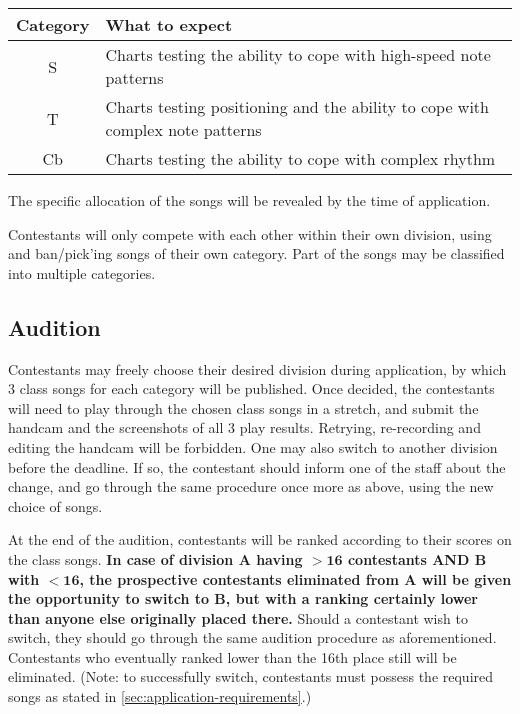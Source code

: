 \documentclass{article}
\newcommand{\alert}[1]{{\color{red} #1}}
\begin{document}
\begin{table}[!htbp]
	\centering
	\begin{tabular}{cl}
		\hline
		Category & What to expect                                                                \\ \hline
		S        & Charts testing the ability to cope with high-speed note patterns              \\
		T        & Charts testing positioning and the ability to cope with complex note patterns \\
		Cb       & Charts testing the ability to cope with complex rhythm                        \\ \hline
	\end{tabular}
\end{table}

\alert{
	The specific allocation of the songs  %
	will be revealed by the time of application.
}

Contestants will only compete with each other
within their own division,
using and ban/pick'ing songs of their own category.
Part of the songs may be classified into multiple categories.

\subsection{Audition}

Contestants may freely choose their desired division
during application,
by which 3 class songs for each category will be published.
Once decided, the contestants will need to play through the chosen class songs in a stretch,
and submit the handcam and the screenshots of all 3 play results.
Retrying, re-recording and editing the handcam will be forbidden.  %
One may also switch to another division before the deadline.
If so, the contestant should inform one of the staff about the change,
and go through the same procedure once more as above,
using the new choice of songs.  %

At the end of the audition,
contestants will be ranked
according to their scores on the class songs.
\textbf{In case of division A having $\mathbf{> 16}$ contestants
	AND B with $\mathbf{< 16}$,
	the prospective contestants eliminated from A
	will be given the opportunity to switch to B,
	but with a ranking certainly lower than
	anyone else originally placed there.}
Should a contestant wish to switch,
they should go through the same
audition procedure as aforementioned.
Contestants who eventually ranked lower than the 16th place
still will be eliminated.
(Note: to successfully switch, contestants
must possess the required songs
as stated in \cref{sec:application-requirements}.)
\end{document}
